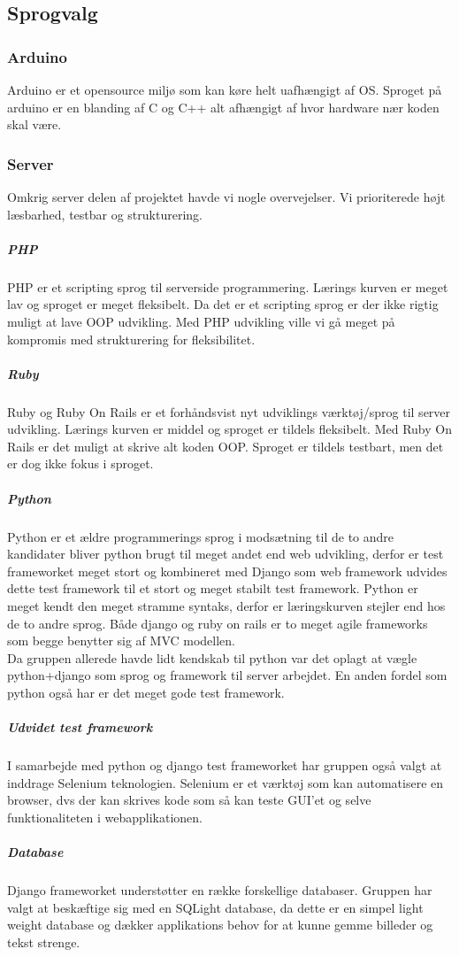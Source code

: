 \subsection*{Sprogvalg}

\subsubsection*{Arduino}
Arduino er et opensource miljø som kan køre helt uafhængigt af OS. Sproget på arduino er en blanding af C og C++ alt afhængigt af hvor hardware nær koden skal være.

\subsubsection*{Server}
Omkrig server delen af projektet havde vi nogle overvejelser. Vi prioriterede højt læsbarhed, testbar og strukturering.

\subparagraph*{PHP}
PHP er et scripting sprog til serverside programmering. Lærings kurven er meget lav og sproget er meget fleksibelt. Da det er et scripting sprog er der ikke rigtig muligt at lave OOP udvikling. Med PHP udvikling ville vi gå meget på kompromis med strukturering for fleksibilitet. 

\subparagraph*{Ruby}
Ruby og Ruby On Rails er et forhåndsvist nyt udviklings værktøj/sprog til server udvikling. Lærings kurven er middel og sproget er tildels fleksibelt. Med Ruby On Rails er det muligt at skrive alt koden OOP. Sproget er tildels testbart, men det er dog ikke fokus i sproget. 

\subparagraph*{Python}
Python er et ældre programmerings sprog i modsætning til de to andre kandidater bliver python brugt til meget andet end web udvikling, derfor er test frameworket meget stort og kombineret med Django som web framework udvides dette test framework til et stort og meget stabilt test framework. Python er meget kendt den meget stramme syntaks, derfor er læringskurven stejler end hos de to andre sprog. Både django og ruby on rails er to meget agile frameworks som begge benytter sig af MVC modellen.\\

Da gruppen allerede havde lidt kendskab til python var det oplagt at vægle python+django som sprog og framework til server arbejdet. En anden fordel som python også har er det meget gode test framework.

\subparagraph*{Udvidet test framework}
I samarbejde med python og django test frameworket har gruppen også valgt at inddrage Selenium teknologien. Selenium er et værktøj som kan automatisere en browser, dvs der kan skrives kode som så kan teste GUI'et og selve funktionaliteten i webapplikationen. 

\subparagraph*{Database}
Django frameworket understøtter en række forskellige databaser. Gruppen har valgt at beskæftige sig med en SQLight database, da dette er en simpel light weight database og dækker applikations behov for at kunne gemme billeder og tekst strenge. 